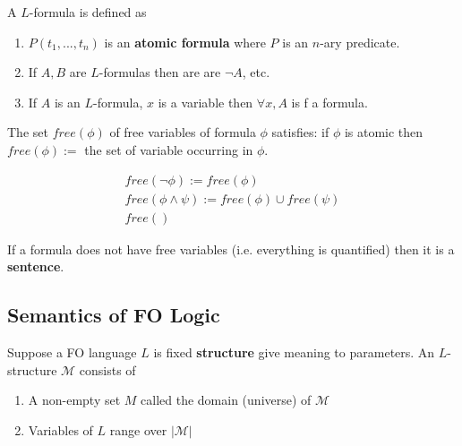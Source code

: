 \documentclass[twoside]{article}
\begin{document}
A $L$-formula is defined as
\begin{enumerate}
\item $P(t_1, ..., t_n)$ is an \textbf{atomic formula} where $P$ is an $n$-ary predicate.
\item If $A, B$ are $L$-formulas then are are $\lnot A$, etc.
\item If $A$ is an $L$-formula, $x$ is a variable then $\forall x, A$ is f a formula.
\end{enumerate}
The set $free(\phi)$ of free variables of formula $\phi$ satisfies: if $\phi$ is atomic then $free(\phi) :=$ the set of variable occurring in $\phi$. 

\begin{align*}
free(\lnot \phi) := free(\phi) \\
free(\phi \land \psi) := free(\phi) \cup free(\psi) \\
free()
\end{align*}

If a formula does not have free variables (i.e. everything is quantified) then it is a \textbf{sentence}. 

\subsection{Semantics of FO Logic}
Suppose a FO language $L$ is fixed \textbf{structure} give meaning to parameters. An $L$-structure $\mathcal{M}$ consists of 
\begin{enumerate}
\item A non-empty set $M$ called the domain (universe) of $\mathcal{M}$
\item Variables of $L$ range over $|\mathcal{M}|$
\end{enumerate}
\end{document}
